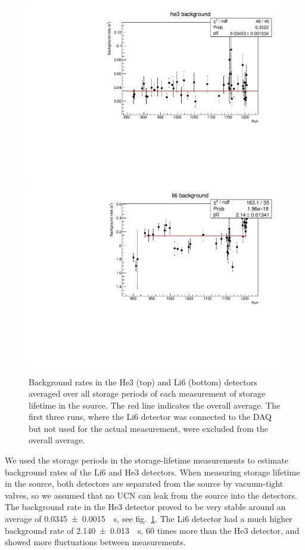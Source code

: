 \documentclass[10pt,letterpaper]{article}
\begin{document}
\begin{figure}
\centering
\includegraphics[width=\textwidth]{../storagelifetime/he3_background.pdf}
\includegraphics[width=\textwidth]{../storagelifetime/li6_background.pdf}
\caption{Background rates in the He3 (top) and Li6 (bottom) detectors averaged over all storage periods of each measurement of storage lifetime in the source. The red line indicates the overall average. The first three runs, where the Li6 detector was connected to the DAQ but not used for the actual measurement, were excluded from the overall average.}
\label{fig:background1}
\end{figure}

We used the storage periods in the storage-lifetime measurements to estimate background rates of the Li6 and He3 detectors. When measuring storage lifetime in the source, both detectors are separated from the source by vacuum-tight valves, so we assumed that no UCN can leak from the source into the detectors. The background rate in the He3 detector proved to be very stable around an average of \SI{0.0345 +- 0.0015}{\per\second}, see fig.~\ref{fig:background1}. The Li6 detector had a much higher background rate of \SI{2.140 +- 0.013}{\per\second}, 60 times more than the He3 detector, and showed more fluctuations between measurements.
\end{document}
